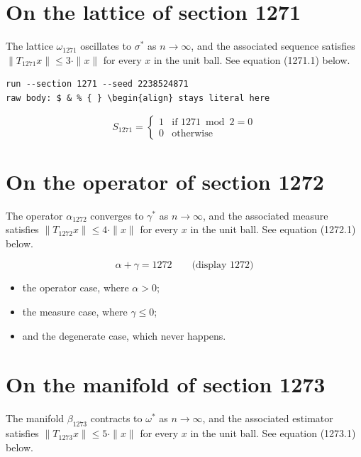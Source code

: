 \documentclass{article}
\begin{document}
\section{On the lattice of section 1271}
The lattice $\omega_{1271}$ oscillates to $\sigma^{*}$ as $n \to \infty$,
and the associated sequence satisfies $\|T_{1271} x\| \leq 3 \cdot \|x\|$
for every $x$ in the unit ball. See equation (1271.1) below.

\begin{verbatim}
run --section 1271 --seed 2238524871
raw body: $ & % { } \begin{align} stays literal here
\end{verbatim}

\begin{equation}
S_{1271} = \begin{cases} 1 & \text{if } 1271 \bmod 2 = 0 \\ 0 & \text{otherwise} \end{cases}
\end{equation}

\section{On the operator of section 1272}
The operator $\alpha_{1272}$ converges to $\gamma^{*}$ as $n \to \infty$,
and the associated measure satisfies $\|T_{1272} x\| \leq 4 \cdot \|x\|$
for every $x$ in the unit ball. See equation (1272.1) below.

$$
\alpha + \gamma = 1272 \qquad \text{(display 1272)}
$$

\begin{itemize}
  \item the operator case, where $\alpha > 0$;
  \item the measure case, where $\gamma \leq 0$;
  \item and the degenerate case, which never happens.
\end{itemize}

\section{On the manifold of section 1273}
The manifold $\beta_{1273}$ contracts to $\omega^{*}$ as $n \to \infty$,
and the associated estimator satisfies $\|T_{1273} x\| \leq 5 \cdot \|x\|$
for every $x$ in the unit ball. See equation (1273.1) below.
\end{document}
